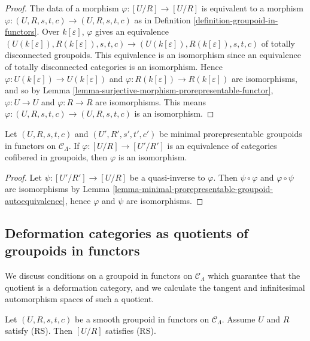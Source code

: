\begin{proof}
The data of a morphism $\varphi: [U/R] \rightarrow [U/R]$ is equivalent to a 
morphism $\varphi: (U,R,s,t,c) \rightarrow (U,R,s,t,c)$ as in Definition 
\ref{definition-groupoid-in-functors}.  Over $k[\varepsilon]$, $\varphi$ gives 
an equivalence $(U(k[\varepsilon]),R(k[\varepsilon]), s,t,c) \rightarrow 
(U(k[\varepsilon]),R(k[\varepsilon]), s,t,c)$ of totally disconnected 
groupoids.  This equivalence is an isomorphism since an equivalence of totally 
disconnected categories is an isomorphism. Hence $\varphi: U(k[\varepsilon]) 
\rightarrow U(k[\varepsilon])$ and $\varphi: R(k[\varepsilon]) \rightarrow 
R(k[\varepsilon])$ are isomorphisms, and so by Lemma 
\ref{lemma-surjective-morphism-prorepresentable-functor}, $\varphi: U 
\rightarrow U$ and $\varphi: R \rightarrow R$ are isomorphisms.  This means 
$\varphi: (U,R,s,t,c) \rightarrow (U,R,s,t,c)$ is an isomorphism.
\end{proof}

\begin{lemma}
\label{lemma-minimal-prorepresentable-groupoid-equivalence}
Let $(U,R,s,t,c)$ and $(U',R',s',t',c')$ be minimal prorepresentable groupoids 
in functors on $\mathcal C_{\Lambda}$.  If $\varphi: [U/R] \rightarrow [U'/R']$ 
is an equivalence of categories cofibered in groupoids, then $\varphi$ is an 
isomorphism. 
\end{lemma}

\begin{proof}
Let $\psi: [U'/R'] \rightarrow [U/R]$ be a quasi-inverse to $\varphi$.  Then 
$\psi \circ \varphi$ and $\varphi \circ \psi$ are isomorphisms by Lemma 
\ref{lemma-minimal-prorepresentable-groupoid-autoequivalence}, hence $\varphi$ 
and $\psi$ are isomorphisms.
\end{proof}

\subsection{Deformation categories as quotients of groupoids in functors}
\label{subsection-deformation-categories-as-quotients}

\noindent
We discuss conditions on a groupoid in functors on $\mathcal C_{\Lambda}$ which 
guarantee that the quotient is a deformation category, and we calculate the 
tangent and infinitesimal automorphism spaces of such a quotient.

\begin{lemma}
\label{lemma-smooth-RS-groupoid-in-functors-quotient}
Let $(U, R, s,t,c)$ be a smooth groupoid in functors on $\mathcal C_{\Lambda}$. 
Assume $U$ and $R$ satisfy \textnormal{(RS)}. Then $[U/R]$ satisfies 
\textnormal{(RS)}.
\end{lemma}

